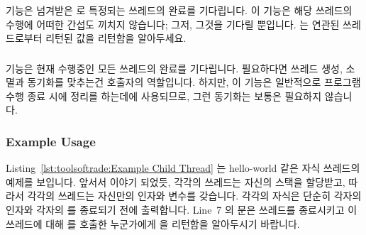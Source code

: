  기능은 넘겨받은  로 특정되는 쓰레드의 완료를
기다립니다.
이 기능은 해당 쓰레드의 수행에 어떠한 간섭도 끼치지 않습니다; 그저, 그것을
기다릴 뿐입니다.
 는 연관된 쓰레드로부터 리턴된 값을 리턴함을 알아두세요.

\subsubsection{}

 기능은 현재 수행중인 모든 쓰레드의 완료를 기다립니다.
필요하다면 쓰레드 생성, 소멸과 동기화를 맞추는건 호출자의 역할입니다.
하지만, 이 기능은 일반적으로 프로그램 수행 종료 시에 정리를 하는데에
사용되므로, 그런 동기화는 보통은 필요하지 않습니다.

\subsubsection{Example Usage}

Listing~\ref{lst:toolsoftrade:Example Child Thread}
는 hello-world 같은 자식 쓰레드의 예제를 보입니다.
앞서서 이야기 되었듯, 각각의 쓰레드는 자신의 스택을 할당받고, 따라서 각각의
쓰레드는 자신만의  인자와  변수를 갖습니다.
각각의 자식은 단순히 각자의 인자와 각자의  를 종료되기 전에
출력합니다.
Line~7 의  문은 쓰레드를 종료시키고 이 쓰레드에 대해
 를 호출한 누군가에게  을 리턴함을 알아두시기
바랍니다.

